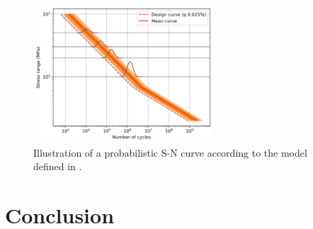 \begin{figure}
    \centering
    \includegraphics[width=0.6\textwidth]{./part1/figures/probabilistic_fatigue.jpg}
    \caption{Illustration of a probabilistic S-N curve according to the model defined in \citet{guede_2007}.}
    \label{fig:probabilistic_SN}
\end{figure}


\section{Conclusion}



